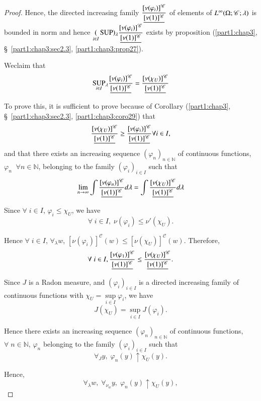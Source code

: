 \begin{proof}
Hence, the directed increasing family
$\dfrac{[\nu(\varphi_i)]^\mathscr{C}}{\underline{[\nu(1)]^\mathscr{C}}}$ of
elements of $L^\infty (\Omega;\break \mathscr{C}; \lambda)$ is bounded in
norm and hence $\underset{i\in I}(\operatorname{SUP}){}_\lambda
\dfrac{[\nu(\varphi_i)]^\mathscr{C}}{\underline{[\nu(1)]^\mathscr{C}}}$ exists by
proposition (\ref{part1:chap3}, \S\ \ref{part1:chap3:sec2.3}, \ref{part1:chap3:prop27}). 

We\pageoriginale claim that 
$$
\underset{i\in I}{\operatorname{SUP}} {}_\lambda
\frac{[\nu(\varphi_i)]^\mathscr{C}}{\underline{[\nu(1)]^\mathscr{C}}} =
\frac{[\nu(\chi_U)]^\mathscr{C}}{\underline{[\nu(1)]^\mathscr{C}}}
$$

To prove this, it is sufficient to prove because of Corollary (\ref{part1:chap3},
\S\ \ref{part1:chap3:sec2.3}, \ref{part1:chap3:coro29}) that 
$$
\frac{[\nu(\chi_U)]^\mathscr{C}}{\underline{[\nu(1)]^\mathscr{C}}} \geq
\frac{[\nu(\varphi_i)]^\mathscr{C}}{\underline{[\nu(1)]^\mathscr{C}}} \forall
i \in I, 
$$
and that there exists an increasing sequence $(\varphi_n)_{n
  \in\mathbb{N}}$ of continuous functions, $\varphi_n \;\; \forall n \in
\mathbb{N}$, belonging to the family $(\varphi_i)_{i \in I}$ such that 
$$
\lim\limits_{n \to \infty} \int
\frac{[\nu(\varphi_n)]^\mathscr{C}}{\underline{[\nu(1)]^\mathscr{C}}} d
\lambda = \int\frac{[\nu(\chi_U)]^\mathscr{C}}{\underline{[\nu(1)]^\mathscr{C}}} d \lambda
$$

Since $\forall \; i \in I$, $\varphi_i \leq \chi_U$, we have
$$
\forall \; i \in I, \; \nu(\varphi_i) \leq \nu'(\chi_U). 
$$

Hence $\forall \; i \in I$, $\forall_\lambda w$,
$[\nu(\varphi_i)]^\mathscr{C} (w) \leq [\nu
  (\chi_U)]^\mathscr{C}(w)$. Therefore, 
$$
\forall \; i \in I,
\frac{[\nu(\varphi_1)]^\mathscr{C}}{\underline{[\nu(1)]^\mathscr{C}}}  \leq
\dfrac{[\nu (\chi_U)]^\mathscr{C}}{\underline{[\nu(1)]^\mathscr{C}}}. 
$$

Since $J$ is a Radon measure, and $(\varphi_i)_{i \in I}$ is a
directed increasing family of continuous functions with $\chi_U =
\sup\limits_{i \in I} \varphi_i$, we have
$$
J(\chi_U) = \sup\limits_{i \in I} J(\varphi_i). 
$$

Hence there exists an increasing sequence $(\varphi_n)_{n \in
  \mathbb{N}}$ of continuous functions, $\forall \; n \in \mathbb{N}$,
$\varphi_n$ belonging to the family $(\varphi_i)_{i \in I}$ such that
$$
\forall_J y, \; \varphi_n (y) \uparrow \chi_U (y). 
$$

Hence,\pageoriginale 
$$
\forall_\lambda w, \; \forall_{\nu_w} y, \; \varphi_n (y) \uparrow
\chi_U(y), 
$$


\end{proof}
